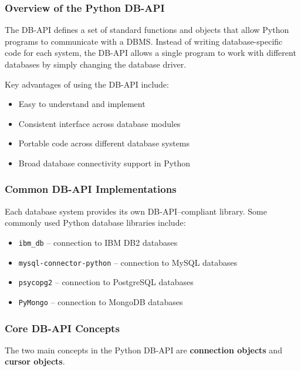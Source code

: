 \documentclass{article}
\begin{document}
\subsubsection{Overview of the Python DB-API}

The DB-API defines a set of standard functions and objects that allow Python programs to communicate with a DBMS.  
Instead of writing database-specific code for each system, the DB-API allows a single program to work with different databases by simply changing the database driver.

Key advantages of using the DB-API include:
\begin{itemize}
    \item Easy to understand and implement
    \item Consistent interface across database modules
    \item Portable code across different database systems
    \item Broad database connectivity support in Python
\end{itemize}

\subsubsection{Common DB-API Implementations}

Each database system provides its own DB-API–compliant library.  
Some commonly used Python database libraries include:
\begin{itemize}
    \item \texttt{ibm\_db} – connection to IBM DB2 databases
    \item \texttt{mysql-connector-python} – connection to MySQL databases
    \item \texttt{psycopg2} – connection to PostgreSQL databases
    \item \texttt{PyMongo} – connection to MongoDB databases
\end{itemize}

\subsubsection{Core DB-API Concepts}

The two main concepts in the Python DB-API are \textbf{connection objects} and \textbf{cursor objects}.
\end{document}
